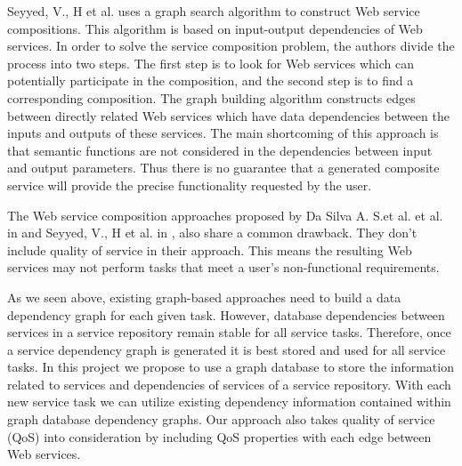 Seyyed, V., H et al. \cite{5} uses a graph search algorithm to construct Web service compositions. This algorithm is based on input-output dependencies of Web services. In order to solve the service composition problem, the authors divide the process into two steps. The first step is to look for Web services which can potentially participate in the composition, and the second step is to find a corresponding composition. The graph building algorithm constructs edges between directly related Web services which have data dependencies between the inputs and outputs of these services. The main shortcoming of this approach is that semantic functions are not considered in the dependencies between input and output parameters. Thus there is no guarantee that a generated composite service will provide the precise functionality requested by the user.\par
The Web service composition approaches proposed by Da Silva A. S.et al. et al. in \cite{2} and Seyyed, V., H et al. in \cite{5}, also share a common drawback. They don't include quality of service in their approach. This means the resulting Web services may not perform tasks that meet a user's non-functional requirements.\par
As we seen above, existing graph-based approaches need to build a data dependency graph for each given task. However, database dependencies between services in a service repository remain stable for all service tasks. Therefore, once a service dependency graph is generated it is best stored and used for all service tasks. In this project we propose to use a graph database to store the information related to services and dependencies of services of a service repository. With each new service task we can utilize existing dependency information contained within graph database dependency graphs. Our approach also takes quality of service (QoS) into consideration by including QoS properties with each edge between Web services.    